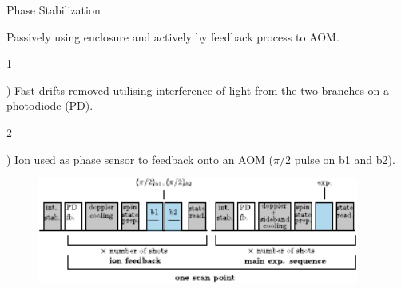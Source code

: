 \documentclass[final]{beamer}
\newcommand{\SubItem}[1]{
    {\setlength\itemindent{15pt} \item[] #1}
}
\begin{document}
\begin{frame}{}
\begin{center}
\begin{columns}[t]
\begin{column}{0.49\textwidth}
\begin{alertblock}{Phase Stabilization}
\begin{minipage}{0.47\linewidth}
      \end{minipage}
      \begin{minipage}{0.53\linewidth}
      \begin{itemize}
      \item Passively using enclosure and actively by feedback process to AOM.\\
      \SubItem 1) Fast drifts removed utilising interference of light
            from the two branches on a photodiode (PD).\\

      \SubItem 2) Ion used as phase
            sensor to feedback onto an AOM ($\pi/2$ pulse on b1 and b2). \\

      \begin{figure}
        \includegraphics[width=0.94\textwidth]{./figs/beam_seq.pdf}
      \end{figure}

      \end{itemize}
      \end{minipage}
    \end{alertblock}


\end{column}
\end{columns}
\end{center}
\end{frame}
\end{document}
